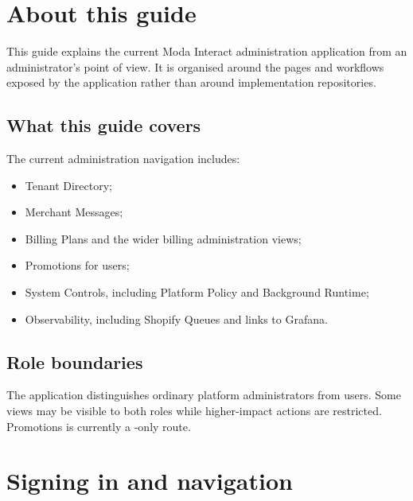 \chapter{About this guide}

This guide explains the current Moda Interact administration application from an administrator's point of view. It is organised around the pages and workflows exposed by the application rather than around implementation repositories.

\section{What this guide covers}
The current administration navigation includes:
\begin{itemize}
  \item Tenant Directory;
  \item Merchant Messages;
  \item Billing Plans and the wider billing administration views;
  \item Promotions for  users;
  \item System Controls, including Platform Policy and Background Runtime;
  \item Observability, including Shopify Queues and links to Grafana.
\end{itemize}


\section{Role boundaries}
The application distinguishes ordinary platform administrators from  users. Some views may be visible to both roles while higher-impact actions are restricted. Promotions is currently a -only route.


\chapter{Signing in and navigation}

